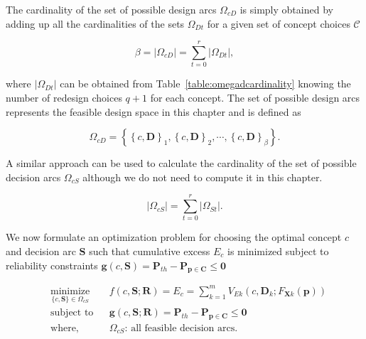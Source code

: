 The cardinality of the set of possible design arcs $\Omega_{cD}$ is simply obtained by adding up all the cardinalities of the sets $\Omega_{Dt}$ for a given set of concept choices $\mathcal{C}$

\begin{equation} \label{eq:cardinailitycdarc}
	\beta = |\Omega_{cD}| = \sum\limits_{t=0}^{r} |\Omega_{Dt}|,
\end{equation}

where $|\Omega_{Dt}|$ can be obtained from Table~\ref{table:omegadcardinality} knowing the number of redesign choices $q+1$ for each concept. The set of possible design arcs represents the feasible design space in this chapter and is defined as

\begin{equation} \label{eq:feasibledesignset}
	\Omega_{cD} = \left\{\left\{c,\mathbf{D}\right\}_1,\left\{c,\mathbf{D}\right\}_2,\cdots,\left\{c,\mathbf{D}\right\}_\beta\right\}.
\end{equation}

A similar approach can be used to calculate the cardinality of the set of possible decision arcs $\Omega_{cS}$ although we do not need to compute it in this chapter.

\begin{equation} \label{eq:cardinailitycsarc}
	|\Omega_{cS}| = \sum\limits_{t=0}^{r} |\Omega_{St}|.
\end{equation}

We now formulate an optimization problem for choosing the optimal concept $c$ and decision arc $\mathbf{S}$ such that cumulative excess $E_c$ is minimized subject to reliability constraints $\mathbf{g}(c,\mathbf{S}) = \mathbf{P}_{th} - \mathbf{P}_{\mathbf{p} \in \mathbf{C}} \le \mathbf{0}$

\begin{equation}
	\label{eq:TSEoptproblem}
	\begin{aligned}
		& \underset{\{c,\mathbf{S}\}\in\Omega_{cS}}{\text{minimize}}
		& & {f}(c,\mathbf{S};\mathbf{R}) = E_c = \sum\limits_{k=1}^{m} V_{Ek}(c,\mathbf{D}_k;F_{\mathbf{X}k}(\mathbf{p}))\\
		& \text{subject to}
		& & \mathbf{g}(c,\mathbf{S};\mathbf{R}) = \mathbf{P}_{th} - \mathbf{P}_{\mathbf{p} \in \mathbf{C}} \le \mathbf{0}\\
		& \text{where,}
		& & \Omega_{cS}\text{: all feasible decision arcs}.\\
	\end{aligned}
\end{equation}

